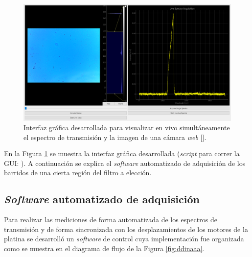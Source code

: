 \begin{figure}[H]
	\centering
	\includegraphics[width=1.0\textwidth]{Figs/microespectrometro/medicionbandacelesteGUI.png}
	\caption{Interfaz gráfica desarrollada para visualizar en vivo simultáneamente el espectro de transmisión y la imagen de una cámara \textit{web} [\href{https://github.com/jrr1984/defectsGUI/blob/master/start.py}{\faGithub}].}
	\label{fig:inaaa}
\end{figure}

En la Figura \ref{fig:inaaa} se muestra la interfaz gráfica desarrollada (\textit{script} para correr la GUI: \href{https://github.com/jrr1984/defectsGUI/blob/master/start.py}{\faGithub}). A continuación se explica el \textit{software} automatizado de adquisición de los barridos de una cierta región del filtro a elección.


\singlespacing
\subsection{\textit{Software} automatizado de adquisición}
\label{sec:softadq}

 \hspace{0.5cm}Para realizar las mediciones de forma automatizada de los espectros de transmisión y de forma sincronizada con los desplazamientos de los motores de la platina se desarrolló un \textit{software} de control cuya implementación fue organizada como se muestra en el diagrama de flujo de la Figura \ref{fig:ddinaaa}.
 

